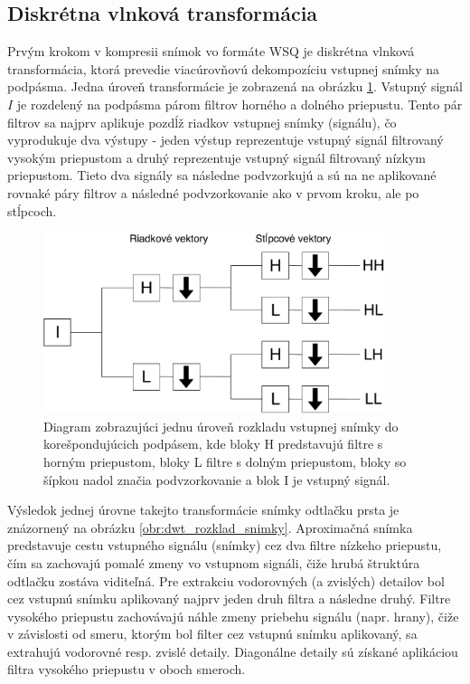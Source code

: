   \subsection{Diskrétna vlnková transformácia}
  Prvým krokom v kompresii snímok vo formáte WSQ je diskrétna vlnková transformácia, ktorá prevedie viacúrovňovú dekompozíciu vstupnej snímky na 
  podpásma. Jedna úroveň transformácie je zobrazená na obrázku \ref{obr:DWT_uroven}. Vstupný signál $I$ je rozdelený na podpásma párom filtrov horného
  a dolného priepustu. Tento pár filtrov sa najprv aplikuje pozdĺž riadkov vstupnej snímky (signálu), čo vyprodukuje dva výstupy - jeden výstup reprezentuje
  vstupný signál filtrovaný vysokým priepustom a druhý reprezentuje vstupný signál filtrovaný nízkym priepustom. Tieto dva signály sa následne podvzorkujú
  a sú na ne aplikované rovnaké páry filtrov a následné podvzorkovanie ako v prvom kroku, ale po stĺpcoch.

  \begin{figure}[h]
    \centering
    \includegraphics[width=10cm]{obrazky-figures/DWT_level.pdf}
    \caption{Diagram zobrazujúci jednu úroveň rozkladu vstupnej snímky do korešpondujúcich podpásem, kde bloky H predstavujú filtre s horným priepustom,
    bloky L filtre s dolným priepustom, bloky so šípkou nadol značia podvzorkovanie a blok I je vstupný signál.}
    \label{obr:DWT_uroven}
  \end{figure}

  Výsledok jednej úrovne takejto transformácie snímky odtlačku prsta je znázornený na obrázku \ref{obr:dwt_rozklad_snimky}. Aproximačná snímka predstavuje
  cestu vstupného signálu (snímky) cez dva filtre nízkeho priepustu, čím sa zachovajú pomalé zmeny vo vstupnom signáli, čiže hrubá štruktúra odtlačku zostáva
  viditeľná. Pre extrakciu vodorovných (a zvislých) detailov bol cez vstupnú snímku aplikovaný najprv jeden druh filtra a následne druhý. Filtre vysokého
  priepustu zachovávajú náhle zmeny priebehu signálu (napr. hrany), čiže v závislosti od smeru, ktorým bol filter cez vstupnú snímku aplikovaný,
  sa extrahujú vodorovné resp. zvislé detaily. Diagonálne detaily sú získané aplikáciou filtra vysokého priepustu v oboch smeroch.

